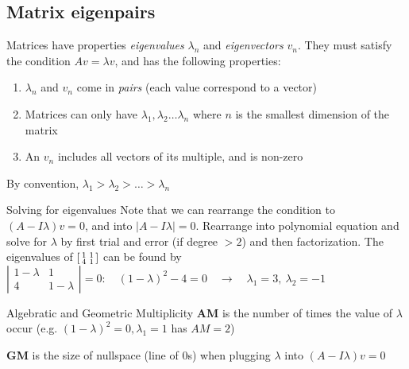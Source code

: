 \documentclass{article}
\begin{document}
\subsection{Matrix eigenpairs}
\label{sec:eigen}
Matrices have properties \emph{eigenvalues} $\lambda_n$ and \emph{eigenvectors} $v_n$. They must satisfy the condition $Av=\lambda v$, and has the following properties:
\begin{enumerate}
    \item $\lambda_n$ and $v_n$ come in \emph{pairs} (each value correspond to a vector)
    \item Matrices can only have $\lambda_1, \lambda_2 \dots \lambda_n$ where $n$ is the smallest dimension of the matrix
    \item An $v_n$ includes all vectors of its multiple, and is non-zero
\end{enumerate}
By convention, $\lambda_1 > \lambda_2 > \dots > \lambda_n$
\begin{knBox}[]{Solving for eigenvalues}
    Note that we can rearrange the condition to $(A-I\lambda)v=0$, and into $|A-I\lambda| = 0$. Rearrange into polynomial equation and solve for $\lambda$ by first trial and error (if degree $> 2$) and then factorization.
    \tcblower
    The eigenvalues of $\begin{bsmallmatrix}
            1&1\\4&1
        \end{bsmallmatrix}$ can be found by $|\begin{smallmatrix}
            1-\lambda&1\\4&1-\lambda
        \end{smallmatrix}|=0:\quad(1-\lambda)^2 - 4 = 0\quad\rightarrow\quad\lambda_1=3,\ \lambda_2=-1$
\end{knBox}
\begin{definition}[]{Algebratic and Geometric Multiplicity}
    \textbf{AM} is the number of times the value of $\lambda$ occur (e.g. $(1-\lambda)^2=0, \lambda_1=1$ has $AM=2$)

    \textbf{GM} is the size of nullspace (line of 0s) when plugging $\lambda$ into $(A-I\lambda)v=0$
\end{definition}
\end{document}
